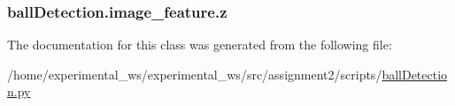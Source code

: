 \subsubsection[{\texorpdfstring{z}{z}}]{\setlength{\rightskip}{0pt plus 5cm}ball\+Detection.\+image\+\_\+feature.\+z\hspace{0.3cm}{\ttfamily [static]}}\hypertarget{classballDetection_1_1image__feature_aae155697ae683625f463cb1839364095}{}\label{classballDetection_1_1image__feature_aae155697ae683625f463cb1839364095}


The documentation for this class was generated from the following file\+:\begin{DoxyCompactItemize}
\item 
/home/experimental\+\_\+ws/experimental\+\_\+ws/src/assignment2/scripts/\hyperlink{ballDetection_8py}{ball\+Detection.\+py}\end{DoxyCompactItemize}
